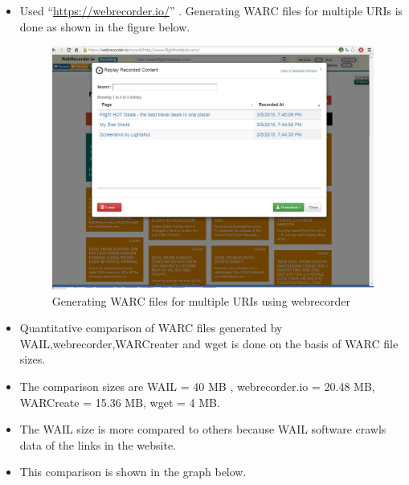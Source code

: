 \begin{itemize}
	\item Used ``\url{https://webrecorder.io/}'' . Generating WARC files for multiple URIs is done as shown in the figure below.
		\begin{figure}[ht]
			\begin{center}
				\includegraphics[scale=0.40]{webrecorderWarc.jpg}
				\caption{Generating WARC files for multiple URIs using webrecorder}
			\end{center}
		\end{figure}	
	\item Quantitative comparison of WARC files generated by WAIL,webrecorder,WARCreater and wget is done on the basis of WARC file sizes.
	\item The comparison sizes are WAIL = 40 MB , webrecorder.io = 20.48 MB, WARCreate = 15.36 MB, wget = 4 MB.
	\item The WAIL size is more compared to others because WAIL software crawls data of the links in the website.
	\item This comparison is shown in the graph below.
		\begin{figure}[ht]
		  	 \begin{center}

\end{center}
\end{figure}
\end{itemize}
